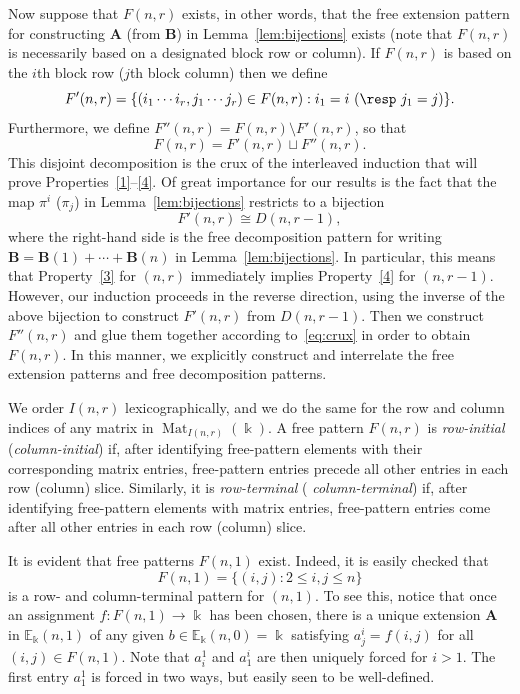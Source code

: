 \documentclass[ALCO,ThmDefs,Unicode,epreuves]{cedram}
\DeclareMathOperator{\Mat}{Mat}
\newcommand{\E}{\mathbb{E}}
\newcommand{\bA}{\mathbf{A}}
\newcommand{\bB}{\mathbf{B}}
\begin{document}
Now suppose that $F(n,r)$ exists, in other words, that the free
extension pattern for constructing $\bA$ (from $\bB$) in Lemma~\ref{lem:bijections} exists (note that $F(n,r)$ is necessarily based on a designated block row or column). If $F(n,r)$ is based on the
$i$th block row (\resp $j$th block column) then we define 
\begin{equation}\label{eq:F'-def}
 F'(n,r) = \{(i_1 \cdots i_r, j_1 \cdots j_r) \in F(n,r):
 i_1 = i\ (\text{\resp}\ j_1 = j)\}.
\end{equation}
Furthermore, we define $F''(n,r)=F(n,r) \setminus F'(n,r)$, so that
\begin{equation}\label{eq:crux}
F(n,r) = F'(n,r) \sqcup F''(n,r).
\end{equation}
This disjoint decomposition is the crux of the interleaved induction
that will prove Properties~\ref{1}--\ref{4}. Of great importance for
our results is the fact that the map $\pi^i$ (\resp $\pi_j$) in Lemma~\ref{lem:bijections} restricts to a bijection
\[
F'(n,r)\cong D(n,r-1),
\]
where the right-hand side is the free decomposition pattern for writing
$\bB = \bB(1)+ \cdots + \bB(n)$ in Lemma~\ref{lem:bijections}. In
particular, this means that Property~\ref{3} for $(n,r)$ immediately
implies Property~\ref{4} for $(n,r-1)$. However, our induction
proceeds in the reverse direction, using the inverse of the above
bijection to construct $F'(n,r)$ from $D(n,r-1)$. Then we construct
$F''(n,r)$ and glue them together according to~\eqref{eq:crux} in
order to obtain $F(n,r)$. In this manner, we explicitly construct and
interrelate the free extension patterns and free decomposition
patterns.


\begin{defi}
We order $I(n,r)$ lexicographically, and we do the same
for the row and column indices of any matrix in
$\Mat_{I(n,r)}(\Bbbk)$. A free pattern $F(n,r)$ is \emph{row-initial}
(\resp \emph{column-initial}) if, after identifying free-pattern
elements with their corresponding matrix entries, free-pattern entries
precede all other entries in each row (\resp column)
slice. Similarly, it is \emph{row-terminal} (\resp
\emph{column-terminal}) if, after identifying free-pattern elements
with matrix entries, free-pattern entries come after all other entries
in each row (\resp column) slice.
\end{defi}

It is evident that free patterns $F(n,1)$ exist. Indeed, it is easily
checked that
\[
F(n,1) = \{(i,j): 2 \le i,j \le n\}
\]
is a row- and column-terminal pattern for $(n,1)$. To see this,
notice that once an assignment $f:F(n,1) \to \Bbbk$ has been chosen,
there is a unique extension $\bA$ in $\E_\Bbbk(n,1)$ of any given $b
\in \E_\Bbbk(n,0) = \Bbbk$ satisfying $a^i_j = f(i,j)$ for all $(i,j)
\in F(n,1)$. Note that $a^1_i$ and $a^i_1$ are then uniquely forced
for $ i>1 $. The first entry $a^1_1$ is forced in two ways, but
easily seen to be well-defined.
\end{document}

